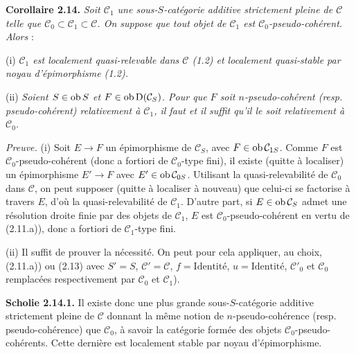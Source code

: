 \documentclass[11pt]{article}
\begin{document}
\textbf{Corollaire 2.14.} \emph{Soit \(\mathcal C_1\) une sous-\(S\)-catégorie additive strictement pleine de \(\mathcal C\) telle que \(\mathcal C_0\subset\mathcal C_1\subset\mathcal C\). On suppose que tout objet de \(\mathcal C_1\) est \(\mathcal C_0\)-pseudo-cohérent.}
\emph{Alors} :

(i) \emph{\(\mathcal C_1\) est localement quasi-relevable dans \(\mathcal C\) (1.2) et localement quasi-stable par noyau d'épimorphisme (1.2).}

(ii) \emph{Soient \(S\in\operatorname{ob} S\) et \(F\in\operatorname{ob}\mathrm D(\mathcal C_S)\). Pour que \(F\) soit \(n\)-pseudo-cohérent (resp. pseudo-cohérent) relativement à \(\mathcal C_1\), il faut et il suffit qu'il le soit relativement à \(\mathcal C_0\).}

\emph{Preuve.} (i) Soit \(E\to F\) un épimorphisme de \(\mathcal C_S\), avec \(F\in\operatorname{ob}\mathcal C_{1S}\). Comme \(F\) est \(\mathcal C_0\)-pseudo-cohérent (donc a fortiori de \(\mathcal C_0\)-type fini), il existe (quitte à localiser) un épimorphisme \(E'\to F\) avec \(E'\in\operatorname{ob}\mathcal C_{0S}\). Utilisant la quasi-relevabilité de \(\mathcal C_0\) dans \(\mathcal C\), on peut supposer (quitte à localiser à nouveau) que celui-ci se factorise à travers \(E\), d'où la quasi-relevabilité de \(\mathcal C_1\). D'autre part, si \(E\in\operatorname{ob}\mathcal C_S\) admet une résolution droite finie par des objets de \(\mathcal C_1\), \(E\) est \(\mathcal C_0\)-pseudo-cohérent en vertu de (2.11.a)), donc a fortiori de \(\mathcal C_1\)-type fini.

(ii) Il suffit de prouver la nécessité. On peut pour cela appliquer, au choix, (2.11.a)) ou (2.13) avec \(S'=S\), \(\mathcal C'=\mathcal C\), \(f=\text{Identité}\), \(u=\text{Identité}\), \(\mathcal C'_0\) et \(\mathcal C_0\) remplacées respectivement par \(\mathcal C_0\) et \(\mathcal C_1\)).

\textbf{Scholie 2.14.1.} Il existe donc une plus grande sous-\(S\)-catégorie additive strictement pleine de \(\mathcal C\) donnant la même notion de \(n\)-pseudo-cohérence (resp. pseudo-cohérence) que \(\mathcal C_0\), à savoir la catégorie formée des objets \(\mathcal C_0\)-pseudo-cohérents. Cette dernière est localement stable par noyau d'épimorphisme.
\end{document}
